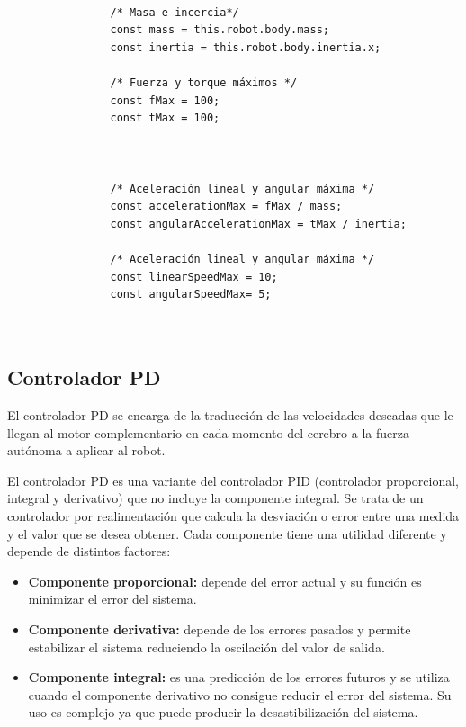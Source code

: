 \small
\begin{verbatim}

                /* Masa e incercia*/
                const mass = this.robot.body.mass;
                const inertia = this.robot.body.inertia.x;
                
                /* Fuerza y torque máximos */
                const fMax = 100;
                const tMax = 100;
                    
                    
                    
                /* Aceleración lineal y angular máxima */
                const accelerationMax = fMax / mass;
                const angularAccelerationMax = tMax / inertia;
                
                /* Aceleración lineal y angular máxima */
                const linearSpeedMax = 10;
                const angularSpeedMax= 5; 
                
                
\end{verbatim}



\subsection{Controlador PD}
\normalsize
El controlador PD se encarga de la traducción de las velocidades deseadas que le llegan al motor complementario en cada momento del cerebro a la fuerza autónoma a aplicar al robot. \newline

El controlador PD es una variante del controlador PID (controlador proporcional, integral y derivativo) que no incluye la componente integral. Se trata de un controlador por realimentación que calcula la desviación o error entre una medida y el valor que se desea obtener. Cada componente tiene una utilidad diferente y depende de distintos factores:
\begin{itemize}
    \item \textbf{Componente proporcional: }depende del error actual y su función es minimizar el error del sistema.
    \item \textbf{Componente derivativa: }depende de los errores pasados y permite estabilizar el sistema reduciendo la oscilación del valor de salida.
    \item \textbf{Componente integral: }es una predicción de los errores futuros y se utiliza cuando el componente derivativo no consigue reducir el error del sistema. Su uso es complejo ya que puede producir la desastibilización del sistema.
\end{itemize}

